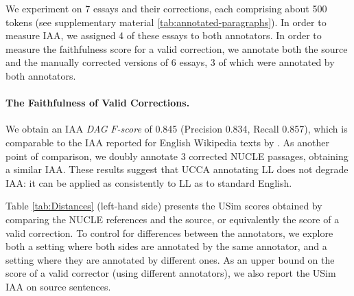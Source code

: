 \documentclass[a4paper, 11pt]{article}
\begin{document}
We experiment on 7 essays and their corrections, each comprising about 500 tokens (see supplementary material \ref{tab:annotated-paragraphs}).
In order to measure IAA, we assigned 4 of these essays to both annotators.
In order to measure the faithfulness score for a valid correction,
we annotate both the source
and the manually corrected versions of 6 essays,
3 of which were annotated by both annotators.

\paragraph{The Faithfulness of Valid Corrections.}
We obtain an IAA {\it DAG $F$-score} of 0.845
(Precision 0.834, Recall 0.857), which
is comparable to the IAA reported for English Wikipedia texts by \citet{abend2013universal}.
As another point of comparison, we doubly annotate 3 corrected
NUCLE \cite{dahlmeier2013building} passages, obtaining a similar IAA.
These results suggest that UCCA annotating LL does not degrade IAA:
it can be applied as consistently to LL as to standard English.

Table \ref{tab:Distances} (left-hand side) presents the {\sc USim} scores obtained by comparing 
the NUCLE references and the source, or equivalently the score of a valid correction.
To control for differences between the annotators, we explore both
a setting where both sides are annotated by the same annotator,
and a setting where they are annotated by different ones.
As an upper bound on the score of a valid corrector (using different annotators),
we also report the {\sc USim} IAA on source sentences. 
\end{document}
